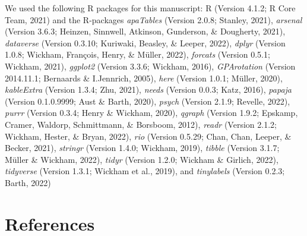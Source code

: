 \documentclass[
  english,
  man]{apa6}
\begin{document}
We used the following R packages for this manuscript: R (Version 4.1.2; R Core Team, 2021) and the R-packages \emph{apaTables} (Version 2.0.8; Stanley, 2021), \emph{arsenal} (Version 3.6.3; Heinzen, Sinnwell, Atkinson, Gunderson, \& Dougherty, 2021), \emph{dataverse} (Version 0.3.10; Kuriwaki, Beasley, \& Leeper, 2022), \emph{dplyr} (Version 1.0.8; Wickham, François, Henry, \& Müller, 2022), \emph{forcats} (Version 0.5.1; Wickham, 2021), \emph{ggplot2} (Version 3.3.6; Wickham, 2016), \emph{GPArotation} (Version 2014.11.1; Bernaards \& I.Jennrich, 2005), \emph{here} (Version 1.0.1; Müller, 2020), \emph{kableExtra} (Version 1.3.4; Zhu, 2021), \emph{needs} (Version 0.0.3; Katz, 2016), \emph{papaja} (Version 0.1.0.9999; Aust \& Barth, 2020), \emph{psych} (Version 2.1.9; Revelle, 2022), \emph{purrr} (Version 0.3.4; Henry \& Wickham, 2020), \emph{qgraph} (Version 1.9.2; Epskamp, Cramer, Waldorp, Schmittmann, \& Borsboom, 2012), \emph{readr} (Version 2.1.2; Wickham, Hester, \& Bryan, 2022), \emph{rio} (Version 0.5.29; Chan, Chan, Leeper, \& Becker, 2021), \emph{stringr} (Version 1.4.0; Wickham, 2019), \emph{tibble} (Version 3.1.7; Müller \& Wickham, 2022), \emph{tidyr} (Version 1.2.0; Wickham \& Girlich, 2022), \emph{tidyverse} (Version 1.3.1; Wickham et al., 2019), and \emph{tinylabels} (Version 0.2.3; Barth, 2022)

\newpage

\hypertarget{references}{%
\section{References}\label{references}}

\begingroup
\setlength{\parindent}{-0.5in}
\setlength{\leftskip}{0.5in}
\end{document}
